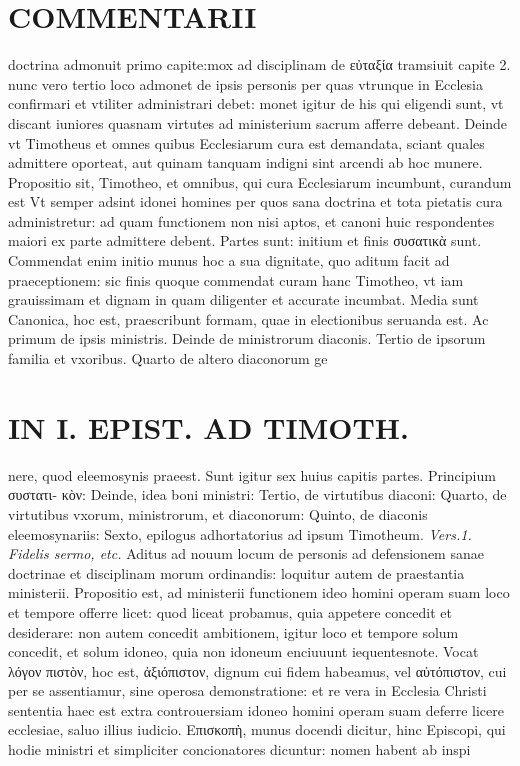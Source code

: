 \documentclass{article}
\begin{document}
\begin{pages}
\section*{COMMENTARII }
\marginpar{[ p.60 ]}\pstart doctrina admonuit primo capite:mox ad disciplinam de εὐταξία tramsiuit capite 2. nunc vero tertio loco admonet de ipsis personis per quas vtrunque in Ecclesia confirmari et vtiliter administrari debet: monet igitur de his qui eligendi sunt, vt discant iuniores quasnam virtutes ad ministerium sacrum afferre debeant. Deinde vt Timotheus et omnes quibus Ecclesiarum cura est demandata, sciant quales admittere oporteat, aut quinam tanquam indigni sint arcendi ab hoc munere.  \pend\pstart Propositio sit, Timotheo, et omnibus, qui cura Ecclesiarum incumbunt, curandum est Vt semper adsint idonei homines per quos sana doctrina et tota pietatis cura administretur: ad quam functionem non nisi aptos, et canoni huic respondentes maiori ex parte admittere debent.  \pend\pstart Partes sunt: initium et finis συσατικὰ sunt. Commendat enim initio munus hoc a sua dignitate, quo aditum facit ad praeceptionem: sic finis quoque commendat curam hanc Timotheo, vt iam grauissimam et dignam in quam diligenter et accurate incumbat. Media sunt Canonica, hoc est, praescribunt formam, quae in electionibus seruanda est. Ac primum de ipsis ministris. Deinde de ministrorum diaconis. Tertio de ipsorum familia et vxoribus. Quarto de altero diaconorum ge\pend
\section*{IN I. EPIST. AD TIMOTH. }
\marginpar{[ p.61 ]}\pstart nere, quod eleemosynis praeest. Sunt igitur sex huius capitis partes. Principium συστατι- κὸν: Deinde, idea boni ministri: Tertio, de virtutibus diaconi: Quarto, de virtutibus vxorum, ministrorum, et diaconorum: Quinto, de diaconis eleemosynariis: Sexto, epilogus adhortatorius ad ipsum Timotheum.  \pend
\textit{Vers.1. Fidelis sermo, etc. }\pstart Aditus ad nouum locum de personis ad defensionem sanae doctrinae et disciplinam morum ordinandis: loquitur autem de praestantia ministerii. Propositio est, ad ministerii functionem ideo homini operam suam loco et tempore offerre licet: quod liceat probamus, quia appetere concedit et desiderare: non autem concedit ambitionem, igitur loco et tempore solum concedit, et solum idoneo, quia non idoneum enciuuunt iequentesnote.  \pend\pstart Vocat λόγον πιστὸν, hoc est, ἀξιόπιστον, dignum cui fidem habeamus, vel αὐτόπιστον, cui per se assentiamur, sine operosa demonstratione: et re vera in Ecclesia Christi sententia haec est extra controuersiam idoneo homini operam suam deferre licere ecclesiae, saluo illius iudicio.  \pend\pstart Επισκοπὴ, munus docendi dicitur, hinc Episcopi, qui hodie ministri et simpliciter concionatores dicuntur: nomen habent ab inspi\pend

\end{pages}
\end{document}
